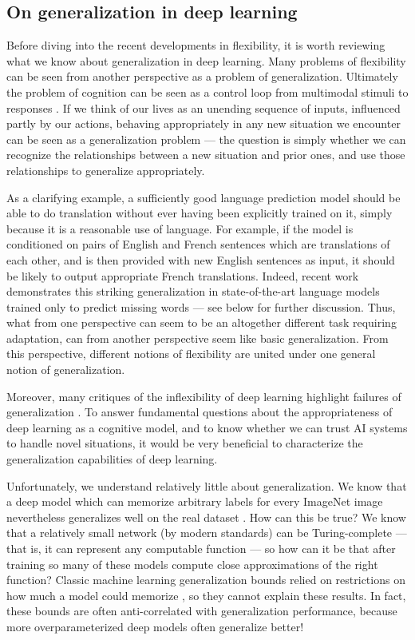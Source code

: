 \subsection{On generalization in deep learning}
Before diving into the recent developments in flexibility, it is worth reviewing what we know about generalization in deep learning. Many problems of flexibility can be seen from another perspective as a problem of generalization. Ultimately the problem of cognition can be seen as a control loop from multimodal stimuli to responses \citep{Cisek1999,Cisek2019}. If we think of our lives as an unending sequence of inputs, influenced partly by our actions, behaving appropriately in any new situation we encounter can be seen as a generalization problem --- the question is simply whether we can recognize the relationships between a new situation and prior ones, and use those relationships to generalize appropriately.\par
As a clarifying example, a sufficiently good language prediction model should be able to do translation without ever having been explicitly trained on it, simply because it is a reasonable use of language. For example, if the model is conditioned on pairs of English and French sentences which are translations of each other, and is then provided with new English sentences as input, it should be likely to output appropriate French translations. Indeed, recent work demonstrates this striking generalization in state-of-the-art language models trained only to predict missing words \citep{Radford2019} --- see below for further discussion. Thus, what from one perspective can seem to be an altogether different task requiring adaptation, can from another perspective seem like basic generalization. From this perspective, different notions of flexibility are united under one general notion of generalization. \par
Moreover, many critiques of the inflexibility of deep learning highlight failures of generalization \citep[e.g.][]{Marcus2018}. To answer fundamental questions about the appropriateness of deep learning as a cognitive model, and to know whether we can trust AI systems to handle novel situations, it would be very beneficial to characterize the generalization capabilities of deep learning. \par 
Unfortunately, we understand relatively little about generalization. We know that a deep model which can memorize arbitrary labels for every ImageNet image nevertheless generalizes well on the real dataset \citep{Zhang2016}. How can this be true? We know that a relatively small network (by modern standards) can be Turing-complete \citep{Siegelman1992} --- that is, it can represent any computable function --- so how can it be that after training so many of these models compute close approximations of the right function? Classic machine learning generalization bounds relied on restrictions on how much a model could memorize \citep[e.g.][]{Vapnik1971}, so they cannot explain these results. In fact, these bounds are often anti-correlated with generalization performance, because more overparameterized deep models often generalize better! \par
